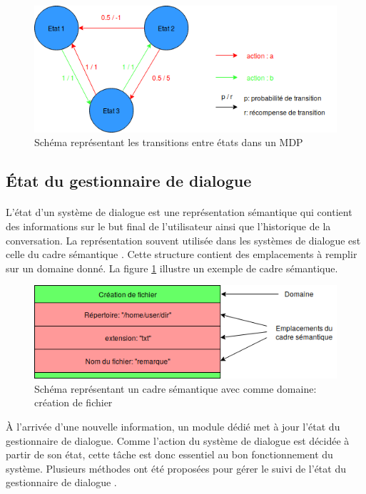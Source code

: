 	\begin{figure}[H]
		\centering
		\includegraphics[width=.95\linewidth]{images/DM/MDP.png} 
		\caption{Schéma représentant les transitions entre états dans un MDP} 
	\end{figure}
	
	
	\subsection{État du gestionnaire de dialogue}\label{trame}
		\paragraph{}
		L’état d’un système de dialogue est une représentation sémantique qui contient des informations sur le but final de l’utilisateur ainsi que l’historique de la conversation. La représentation souvent utilisée dans les systèmes de dialogue est celle du cadre sémantique \cite{Chen2017}. Cette structure contient des emplacements à remplir sur un domaine donné. La figure \ref{SFrame} illustre un exemple de cadre sémantique.\newline
		
		\begin{figure}[H]
			\centering
			\includegraphics[width=.7\linewidth]{images/DM/SFrame.png} 
			\caption{Schéma représentant un cadre sémantique avec comme domaine: création de fichier} 
			\label{SFrame}
		\end{figure}


À l’arrivée d’une nouvelle information, un module dédié met à jour l’état du gestionnaire de dialogue. Comme l’action du système de dialogue est décidée à partir de son état, cette tâche est donc essentiel au bon fonctionnement du système. Plusieurs méthodes ont été proposées pour gérer le suivi de l’état du gestionnaire de dialogue \cite{Williams2007}.
